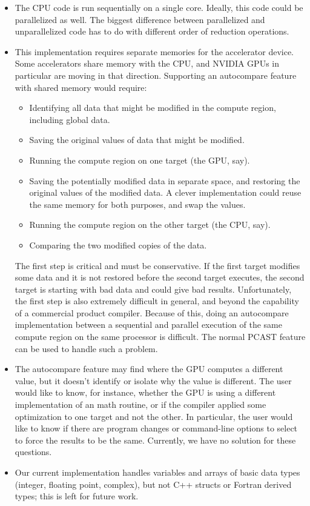\begin{itemize}
\item The CPU code is run sequentially on a single core.
Ideally, this code could be parallelized as well.
The biggest difference between parallelized and unparallelized code has to do with different order of reduction operations.
\item This implementation requires separate memories for the accelerator device.
Some accelerators share memory with the CPU, and NVIDIA GPUs in particular are moving in that direction.
Supporting an autocompare feature with shared memory would require:
\begin{itemize}
\item Identifying all data that might be modified in the compute region, including global data.
\item Saving the original values of data that might be modified.
\item Running the compute region on one target (the GPU, say).
\item Saving the potentially modified data in separate space, and restoring the original values of the modified data.
A clever implementation could reuse the same memory for both purposes, and swap the values.
\item Running the compute region on the other target (the CPU, say).
\item Comparing the two modified copies of the data.
\end{itemize}
The first step is critical and must be conservative.
If the first target modifies some data and it is not restored before the second target executes, the second target is starting with bad data and could give bad results.
Unfortunately, the first step is also extremely difficult in general, and beyond the capability of a commercial product compiler.
Because of this, doing an autocompare implementation between a sequential and parallel execution of the same compute region on the same processor is difficult.
The normal PCAST feature can be used to handle such a problem.
\item The autocompare feature may find where the GPU computes a different value, but it doesn't identify or isolate why the value is different.
The user would like to know, for instance, whether the GPU is using a different implementation of an math routine, or if the compiler applied some optimization to one target and not the other.
In particular, the user would like to know if there are program changes or command-line options to select to force the results to be the same.
Currently, we have no solution for these questions.
\item Our current implementation handles variables and arrays of basic data types (integer, floating point, complex), but not C++ structs or Fortran derived types; this is left for future work.
\end{itemize}
